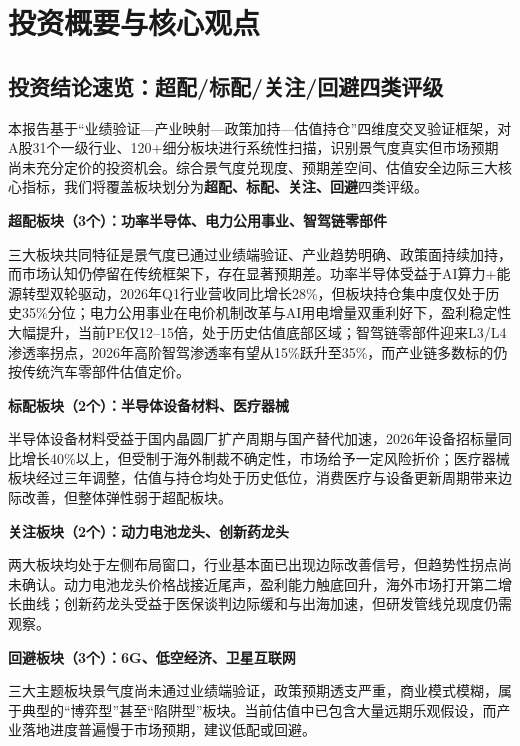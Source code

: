 
\chapter{投资概要与核心观点}

\section{投资结论速览：超配/标配/关注/回避四类评级}

本报告基于“业绩验证—产业映射—政策加持—估值持仓”四维度交叉验证框架，对A股31个一级行业、120+细分板块进行系统性扫描，识别景气度真实但市场预期尚未充分定价的投资机会。综合景气度兑现度、预期差空间、估值安全边际三大核心指标，我们将覆盖板块划分为\textbf{超配、标配、关注、回避}四类评级。

\textbf{超配板块（3个）：功率半导体、电力公用事业、智驾链零部件}

三大板块共同特征是景气度已通过业绩端验证、产业趋势明确、政策面持续加持，而市场认知仍停留在传统框架下，存在显著预期差。功率半导体受益于AI算力+能源转型双轮驱动，2026年Q1行业营收同比增长28\%，但板块持仓集中度仅处于历史35\%分位；电力公用事业在电价机制改革与AI用电增量双重利好下，盈利稳定性大幅提升，当前PE仅12--15倍，处于历史估值底部区域；智驾链零部件迎来L3/L4渗透率拐点，2026年高阶智驾渗透率有望从15\%跃升至35\%，而产业链多数标的仍按传统汽车零部件估值定价。

\textbf{标配板块（2个）：半导体设备材料、医疗器械}

半导体设备材料受益于国内晶圆厂扩产周期与国产替代加速，2026年设备招标量同比增长40\%以上，但受制于海外制裁不确定性，市场给予一定风险折价；医疗器械板块经过三年调整，估值与持仓均处于历史低位，消费医疗与设备更新周期带来边际改善，但整体弹性弱于超配板块。

\textbf{关注板块（2个）：动力电池龙头、创新药龙头}

两大板块均处于左侧布局窗口，行业基本面已出现边际改善信号，但趋势性拐点尚未确认。动力电池龙头价格战接近尾声，盈利能力触底回升，海外市场打开第二增长曲线；创新药龙头受益于医保谈判边际缓和与出海加速，但研发管线兑现度仍需观察。

\textbf{回避板块（3个）：6G、低空经济、卫星互联网}

三大主题板块景气度尚未通过业绩端验证，政策预期透支严重，商业模式模糊，属于典型的“博弈型”甚至“陷阱型”板块。当前估值中已包含大量远期乐观假设，而产业落地进度普遍慢于市场预期，建议低配或回避。

